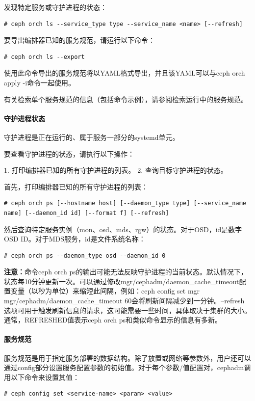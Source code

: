 \documentclass[12pt,UTF8]{ctexbook}
\begin{document}
发现特定服务或守护进程的状态：
\begin{verbatim}
# ceph orch ls --service_type type --service_name <name> [--refresh]
\end{verbatim}

要导出编排器已知的服务规范，请运行以下命令：
\begin{verbatim}
# ceph orch ls --export
\end{verbatim}

使用此命令导出的服务规范将以YAML格式导出，并且该YAML可以与ceph orch apply -i命令一起使用。

有关检索单个服务规范的信息（包括命令示例），请参阅检索运行中的服务规范。

\paragraph{守护进程状态}

守护进程是正在运行的、属于服务一部分的systemd单元。

要查看守护进程的状态，请执行以下操作：

1. 打印编排器已知的所有守护进程的列表。
2. 查询目标守护进程的状态。

首先，打印编排器已知的所有守护进程的列表：
\begin{verbatim}
# ceph orch ps [--hostname host] [--daemon_type type] [--service_name name] [--daemon_id id] [--format f] [--refresh]
\end{verbatim}

然后查询特定服务实例（mon、osd、mds、rgw）的状态。对于OSD，id是数字OSD ID。对于MDS服务，id是文件系统名称：
\begin{verbatim}
# ceph orch ps --daemon_type osd --daemon_id 0
\end{verbatim}

\textbf{注意：}命令ceph orch ps的输出可能无法反映守护进程的当前状态。默认情况下，状态每10分钟更新一次。可以通过修改mgr/cephadm/daemon_cache_timeout配置变量（以秒为单位）来缩短此间隔，例如：ceph config set mgr mgr/cephadm/daemon_cache_timeout 60会将刷新间隔减少到一分钟。--refresh选项可用于触发刷新信息的请求，这可能需要一些时间，具体取决于集群的大小。通常，REFRESHED值表示ceph orch ps和类似命令显示的信息有多新。

\paragraph{服务规范}

服务规范是用于指定服务部署的数据结构。除了放置或网络等参数外，用户还可以通过config部分设置服务配置参数的初始值。对于每个参数/值配置对，cephadm调用以下命令来设置其值：
\begin{verbatim}
# ceph config set <service-name> <param> <value>
\end{verbatim}
\end{document}
